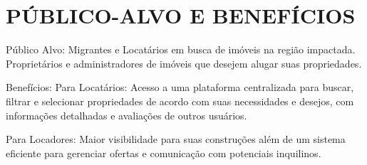 \section{PÚBLICO-ALVO E BENEFÍCIOS}
Público Alvo: Migrantes e Locatários em busca de imóveis na região impactada.  Proprietários e administradores de imóveis que desejem alugar suas propriedades.

Benefícios: 
Para Locatários: Acesso a uma plataforma centralizada para buscar, filtrar e selecionar propriedades de acordo com suas necessidades e desejos, com informações detalhadas e avaliações de outros usuários.

Para Locadores: Maior visibilidade para suas construções além de um sistema eficiente para gerenciar ofertas e comunicação com potenciais inquilinos.




